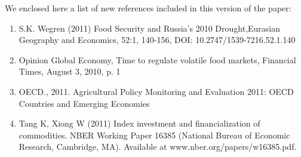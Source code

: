 \documentclass[a4paper,12pt]{article}
\begin{document}
\vskip1cm
We enclosed here a list of new references included in this version of the paper:

\begin{enumerate}
    \item S.K. Wegren (2011) Food Security and Russia's 2010 Drought,Eurasian Geography and Economics, 52:1, 140-156, DOI: 10.2747/1539-7216.52.1.140

    \item Opinion Global Economy, Time to regulate volatile food markets, Financial Times, August 3, 2010, p. 1

    \item OECD., 2011. Agricultural Policy Monitoring and Evaluation 2011: OECD Countries and Emerging Economies

    \item Tang K, Xiong W (2011) Index investment and financialization of commodities. NBER Working Paper 16385 (National Bureau of Economic Research, Cambridge, MA). Available at www.nber.org/papers/w16385.pdf.


\end{enumerate}
\end{document}
